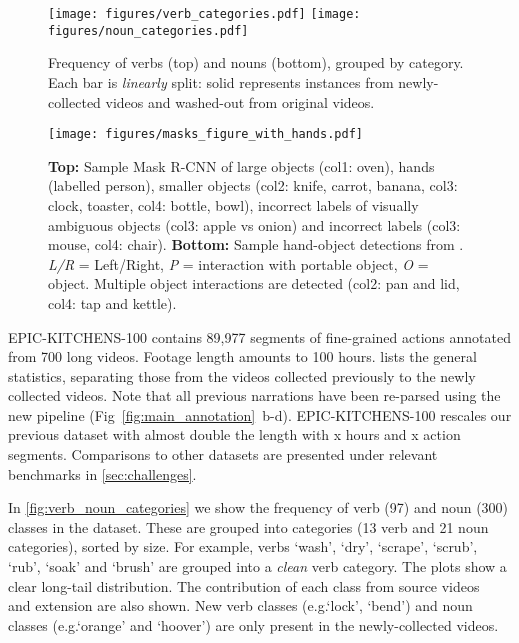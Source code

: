 \RequirePackage{amsmath} \documentclass[runningheads]{llncs}
\makeatletter
\newcommand {\newDataset} {EPIC-KITCHENS-100}
\newcommand*{\eg}{e.g.\@\xspace}
\makeatother
\begin{document}
\begin{figure}[t]
    \centering
    \texttt{[image: figures/verb\_categories.pdf]}
    \texttt{[image: figures/noun\_categories.pdf]}
\caption{Frequency of verbs (top) and nouns (bottom), grouped by category. Each bar is \textit{linearly} split: solid represents instances from newly-collected videos and washed-out from original videos.}
    \label{fig:verb_noun_categories}
    \texttt{[image: figures/masks\_figure\_with\_hands.pdf]}
\caption{\textbf{Top:} Sample Mask R-CNN of large objects (col1: oven), hands (labelled person), smaller objects (col2: knife, carrot, banana, col3: clock, toaster, col4: bottle, bowl), incorrect labels of visually ambiguous objects (col3: apple vs onion) and incorrect labels (col3: mouse, col4: chair).
    \textbf{Bottom:} Sample hand-object detections from \cite{Shan2020Understanding}. \textit{L/R} = Left/Right, \textit{P} = interaction with portable object, \textit{O} = object. Multiple object interactions are detected (col2: pan and lid, col4: tap and kettle).}
    \label{fig:masks}
\end{figure}


\newDataset{} contains 89,977 segments of fine-grained actions annotated from 700 long videos. 
Footage length amounts to 100 hours. 
 lists the general statistics, separating those from the videos collected previously to the newly collected videos. Note that all previous narrations have been re-parsed using the new pipeline (Fig~\ref{fig:main_annotation}~b-d).
\newDataset{} rescales our previous dataset with almost double the length with x hours and x action segments. Comparisons to other datasets are presented under relevant benchmarks in \cref{sec:challenges}.

In \cref{fig:verb_noun_categories} we show the frequency of verb (97) and noun (300) classes in the dataset.
These are grouped into categories (13 verb and 21 noun categories), sorted by size. 
For example, verbs `wash', `dry', `scrape', `scrub', `rub', `soak' and `brush' are grouped into a \textit{clean} verb category. 
The plots show a clear long-tail distribution.
The contribution of each class from source videos~\cite{Damen2018EPICKITCHENS} and extension are also shown. 
New verb classes (\eg `lock', `bend') and noun classes (\eg `orange' and `hoover') are only present in the newly-collected videos.
\end{document}
